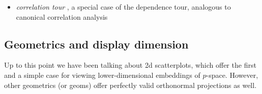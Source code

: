 \documentclass{monashthesis}
\begin{document}
\begin{itemize}
  \begin{itemize}
  \tightlist
  \item
    \emph{correlation tour} \autocite{buja_data_1987}, a special case of the dependence tour, analogous to canonical correlation analysis
  \end{itemize}
\end{itemize}

\hypertarget{geometrics-and-display-dimension}{%
\subsection{Geometrics and display dimension}\label{geometrics-and-display-dimension}}

Up to this point we have been talking about 2d scatterplots, which offer the first and a simple case for viewing lower-dimensional embeddings of \(p\)-space. However, other geometrics (or geoms) offer perfectly valid orthonormal projections as well.
\end{document}
